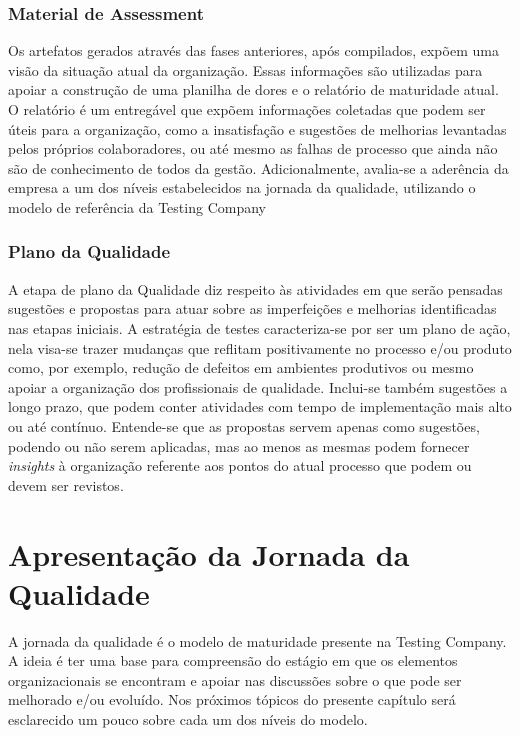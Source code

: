 \documentclass[12pt,a4paper]{report}
\begin{document}
\subsection{Material de Assessment}

Os artefatos gerados através das fases anteriores, após compilados, expõem uma visão da situação atual da organização. Essas informações são utilizadas para apoiar a construção de uma planilha de dores e o relatório de maturidade atual. O relatório é um entregável que expõem informações coletadas que podem ser úteis para a organização, como a insatisfação e sugestões de melhorias levantadas pelos próprios colaboradores, ou até mesmo as falhas de processo que ainda não são de conhecimento de todos da gestão. Adicionalmente, avalia-se a aderência da empresa a um dos níveis estabelecidos na jornada da qualidade, utilizando o modelo de referência da Testing Company


\subsection{Plano da Qualidade}

A etapa de plano da Qualidade diz respeito às atividades em que serão pensadas sugestões e propostas para atuar sobre as imperfeições e melhorias identificadas nas etapas iniciais. A estratégia de testes caracteriza-se por ser um plano de ação, nela visa-se trazer mudanças que reflitam positivamente no processo e/ou produto como, por exemplo, redução de defeitos em ambientes produtivos ou mesmo apoiar a organização dos profissionais de qualidade. Inclui-se também sugestões a longo prazo, que podem conter atividades com tempo de implementação mais alto ou até contínuo. Entende-se que as propostas servem apenas como sugestões, podendo ou não serem aplicadas, mas ao menos as mesmas podem fornecer \textit{insights} à organização referente aos pontos do atual processo que podem ou devem ser revistos.



\chapter{Apresentação da Jornada da Qualidade}

 A jornada da qualidade é o modelo de maturidade presente na Testing Company. A ideia é ter uma base para compreensão do estágio em que os elementos organizacionais se encontram e apoiar nas discussões sobre o que pode ser melhorado e/ou evoluído. Nos próximos tópicos do presente capítulo será esclarecido um pouco sobre cada um dos níveis do modelo.
\end{document}
